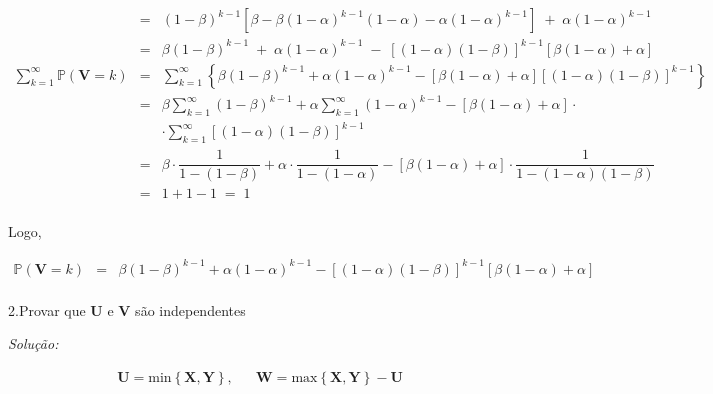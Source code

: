 \documentclass[a4paper, 11pt]{article}
\begin{document}
\begin{equation*}
\begin{array}{lclll}
& = & (1-\beta)^{k-1}\left[ \beta - \beta(1-\alpha)^{k-1}(1-\alpha) - \alpha(1-\alpha)^{k-1}\right] \; + \; \alpha(1-\alpha)^{k-1} \\

& = & \beta(1-\beta)^{k-1} \; + \; \alpha(1-\alpha)^{k-1} \; - \; \left[(1-\alpha)(1-\beta)\right]^{k-1}\left[\beta(1-\alpha) + \alpha\right] \\[25pt]

\displaystyle\sum_{k=1}^{\infty}\mathds{P}(\mathbf{V} = k) & = & \displaystyle\sum_{k=1}^{\infty} \left\{ \beta(1-\beta)^{k-1} + \alpha(1-\alpha)^{k-1} - \left[\beta(1-\alpha) + \alpha\right] \left[ (1-\alpha)(1-\beta) \right]^{k-1}\right\}\\

& = & \beta\displaystyle\sum_{k=1}^{\infty}(1-\beta)^{k-1} + \alpha\displaystyle\sum_{k=1}^{\infty}(1-\alpha)^{k-1} - \left[\beta(1-\alpha) + \alpha\right] \cdot \\

& & \cdot \displaystyle\sum_{k=1}^{\infty}  \left[(1-\alpha)(1-\beta)\right]^{k-1}\\

& = & \beta \cdot \dfrac{1}{1-(1-\beta)} + \alpha \cdot \dfrac{1}{1-(1-\alpha)} - \left[\beta(1-\alpha) + \alpha\right] \cdot \dfrac{1}{1-(1-\alpha)(1-\beta)} \\

& = & 1 + 1 - 1 \; = \; 1 \\

\end{array}
\end{equation*}

Logo, 

\begin{equation*}
\begin{array}{lclll}

\mathds{P}(\mathbf{V} = k) & = & \beta(1-\beta)^{k-1} + \alpha(1-\alpha)^{k-1} -  \left[ (1-\alpha)(1-\beta) \right]^{k-1}\left[\beta (1-\alpha) + \alpha\right] \\[10pt]

\end{array}
\end{equation*}

2.Provar que $\mathbf{U}$ e $\mathbf{V}$ são independentes

\noindent
\textit{Solução:}

\begin{equation*}
\begin{array}{lclll}
\mathbf{U} = \mathrm{min}\left\{ \mathbf{X}, \mathbf{Y} \right\}, & & \mathbf{W} = \mathrm{max}\left\{ \mathbf{X}, \mathbf{Y} \right\} - \mathbf{U}  \\
\end{array}
\end{equation*}
\end{document}
